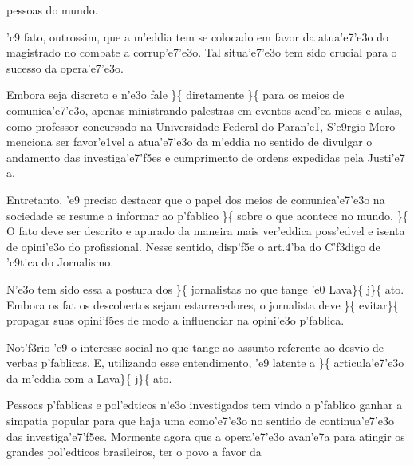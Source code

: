 pessoas do mundo. \par \tab 'c9 fato, outrossim, que a m'eddia tem se
colocado em favor da atua'e7'e3o do magistrado no combate a
corrup'e7'e3o. Tal situa'e7'e3o tem sido crucial para o sucesso da
opera'e7'e3o. \par \tab Embora seja discreto e n'e3o fale
\}\{\rtlch{}  \ltrch{}  diretamente
\}\{\rtlch{}  \ltrch{}  para
os meios de comunica'e7'e3o, apenas ministrando palestras em eventos
acad'ea micos e aulas, como professor concursado na Universidade Federal
do Paran'e1, S'e9rgio Moro menciona ser favor'e1vel a atua'e7'e3o da
m'eddia no sentido de divulgar o andamento das investiga'e7'f5es e
cumprimento de ordens expedidas pela Justi'e7 a. \par \tab Entretanto,
'e9 preciso destacar que o papel dos meios de comunica'e7'e3o na
sociedade se resume a informar ao p'fablico \}\{\rtlch{} 
\ltrch{}  sobre o que acontece no mundo.
\}\{\rtlch{}  \ltrch{}  O fato
deve ser descrito e apurado da maneira mais ver'eddica poss'edvel e
isenta de opini'e3o do profissional. Nesse sentido, disp'f5e o art.4'ba
do C'f3digo de 'c9tica do Jornalismo. \par \tab N'e3o tem sido essa a
postura dos \}\{\rtlch{}  \ltrch{}  jornalistas
no que tange 'e0 Lava\}\{\rtlch{}  \ltrch{} 
j\}\{\rtlch{}  \ltrch{}  ato.
Embora os fat os descobertos sejam estarrecedores, o jornalista deve
\}\{\rtlch{}  \ltrch{}  evitar\}\{\rtlch{}
 \ltrch{}  propagar suas
opini'f5es de modo a influenciar na opini'e3o p'fablica.\\
\par  \tab Not'f3rio 'e9 o interesse social no que tange ao assunto
referente ao desvio de verbas p'fablicas. E, utilizando esse
entendimento, 'e9 latente a \}\{\rtlch{}  \ltrch{}
 articula'e7'e3o da m'eddia com a Lava\}\{ \rtlch{}
 \ltrch{}  j\}\{\rtlch{}  \ltrch{}
 ato. \par \tab Pessoas p'fablicas e
pol'edticos n'e3o investigados tem vindo a p'fablico ganhar a simpatia
popular para que haja uma como'e7'e3o no sentido de continua'e7'e3o das
investiga'e7'f5es. Mormente agora que a opera'e7'e3o avan'e7a para
atingir os grandes pol'edticos brasileiros, ter o povo a favor da
